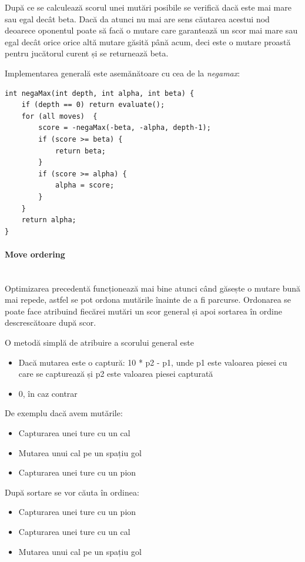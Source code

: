 După ce se calculează scorul unei mutări posibile se verifică dacă este mai mare sau egal
decât beta. Dacă da atunci nu mai are sens căutarea acestui nod deoarece oponentul poate să facă
o mutare care garantează un scor mai mare sau egal decât orice orice altă mutare găsită până acum,
deci este o mutare proastă pentru jucătorul curent și se returnează beta.

\vspace{1.5cm}
Implementarea generală este asemănătoare cu cea de la \textit{negamax}:
\begin{lstlisting}[language=RustHtml]
int negaMax(int depth, int alpha, int beta) {
    if (depth == 0) return evaluate();
    for (all moves)  {
        score = -negaMax(-beta, -alpha, depth-1);
        if (score >= beta) {
            return beta;
        }
        if (score >= alpha) {
            alpha = score;
        }
    }
    return alpha;
}
\end{lstlisting}

\vspace{1cm}
\paragraph{Move ordering}\mbox{} \\

Optimizarea precedentă funcționează mai bine atunci când găsește o mutare bună mai repede,
astfel se pot ordona mutările înainte de a fi parcurse. Ordonarea se poate face atribuind fiecărei
mutări un scor general și apoi sortarea în ordine descrescătoare după scor.

O metodă simplă de atribuire a scorului general este
\begin{itemize}
	\item Dacă mutarea este o captură: 10 * p2 - p1, unde p1 este valoarea piesei cu care se
	      capturează și p2 este valoarea piesei capturată
	\item 0, în caz contrar
\end{itemize}
\vspace{0.5cm}
De exemplu dacă avem mutările:
\begin{itemize}
	\item Capturarea unei ture cu un cal
	\item Mutarea unui cal pe un spațiu gol
	\item Capturarea unei ture cu un pion
\end{itemize}
După sortare se vor căuta în ordinea:
\begin{itemize}
	\item Capturarea unei ture cu un pion
	\item Capturarea unei ture cu un cal
	\item Mutarea unui cal pe un spațiu gol
\end{itemize}

